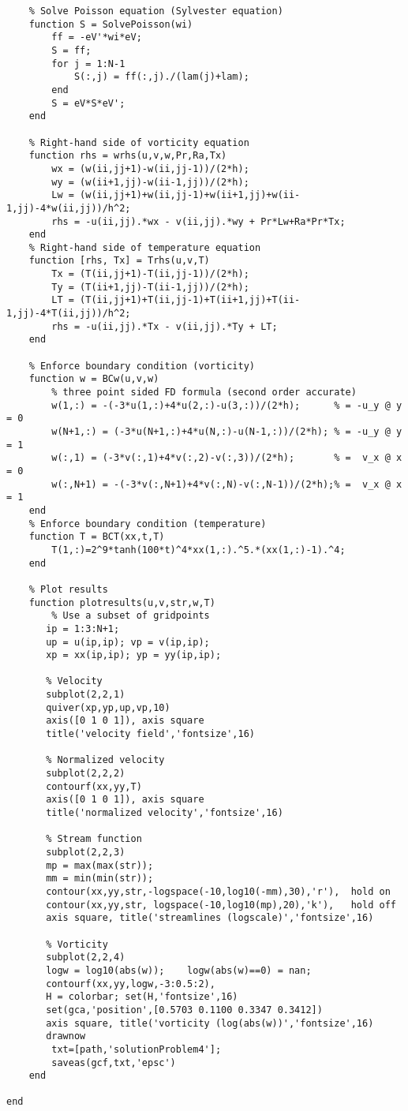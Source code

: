 \begin{verbatim}
    % Solve Poisson equation (Sylvester equation)
    function S = SolvePoisson(wi)
        ff = -eV'*wi*eV;
        S = ff;
        for j = 1:N-1
            S(:,j) = ff(:,j)./(lam(j)+lam);
        end
        S = eV*S*eV';
    end

    % Right-hand side of vorticity equation
    function rhs = wrhs(u,v,w,Pr,Ra,Tx)
        wx = (w(ii,jj+1)-w(ii,jj-1))/(2*h);
        wy = (w(ii+1,jj)-w(ii-1,jj))/(2*h);
        Lw = (w(ii,jj+1)+w(ii,jj-1)+w(ii+1,jj)+w(ii-1,jj)-4*w(ii,jj))/h^2;
        rhs = -u(ii,jj).*wx - v(ii,jj).*wy + Pr*Lw+Ra*Pr*Tx;          
    end
    % Right-hand side of temperature equation
    function [rhs, Tx] = Trhs(u,v,T)
        Tx = (T(ii,jj+1)-T(ii,jj-1))/(2*h);
        Ty = (T(ii+1,jj)-T(ii-1,jj))/(2*h);
        LT = (T(ii,jj+1)+T(ii,jj-1)+T(ii+1,jj)+T(ii-1,jj)-4*T(ii,jj))/h^2;
        rhs = -u(ii,jj).*Tx - v(ii,jj).*Ty + LT;          
    end

    % Enforce boundary condition (vorticity)
    function w = BCw(u,v,w)
        % three point sided FD formula (second order accurate)
        w(1,:) = -(-3*u(1,:)+4*u(2,:)-u(3,:))/(2*h);      % = -u_y @ y = 0
        w(N+1,:) = (-3*u(N+1,:)+4*u(N,:)-u(N-1,:))/(2*h); % = -u_y @ y = 1
        w(:,1) = (-3*v(:,1)+4*v(:,2)-v(:,3))/(2*h);       % =  v_x @ x = 0
        w(:,N+1) = -(-3*v(:,N+1)+4*v(:,N)-v(:,N-1))/(2*h);% =  v_x @ x = 1
    end
    % Enforce boundary condition (temperature)
    function T = BCT(xx,t,T)
        T(1,:)=2^9*tanh(100*t)^4*xx(1,:).^5.*(xx(1,:)-1).^4;
    end

    % Plot results
    function plotresults(u,v,str,w,T)
        % Use a subset of gridpoints
       ip = 1:3:N+1;
       up = u(ip,ip); vp = v(ip,ip);
       xp = xx(ip,ip); yp = yy(ip,ip);
       
       % Velocity
       subplot(2,2,1)
       quiver(xp,yp,up,vp,10)
       axis([0 1 0 1]), axis square
       title('velocity field','fontsize',16)
       
       % Normalized velocity
       subplot(2,2,2)
       contourf(xx,yy,T)
       axis([0 1 0 1]), axis square
       title('normalized velocity','fontsize',16)
       
       % Stream function
       subplot(2,2,3) 
       mp = max(max(str));
       mm = min(min(str));
       contour(xx,yy,str,-logspace(-10,log10(-mm),30),'r'),  hold on
       contour(xx,yy,str, logspace(-10,log10(mp),20),'k'),   hold off
       axis square, title('streamlines (logscale)','fontsize',16)
       
       % Vorticity
       subplot(2,2,4)
       logw = log10(abs(w));    logw(abs(w)==0) = nan;
       contourf(xx,yy,logw,-3:0.5:2), 
       H = colorbar; set(H,'fontsize',16)
       set(gca,'position',[0.5703 0.1100 0.3347 0.3412])
       axis square, title('vorticity (log(abs(w))','fontsize',16) 
       drawnow
        txt=[path,'solutionProblem4'];
        saveas(gcf,txt,'epsc')
    end

end

\end{verbatim}
